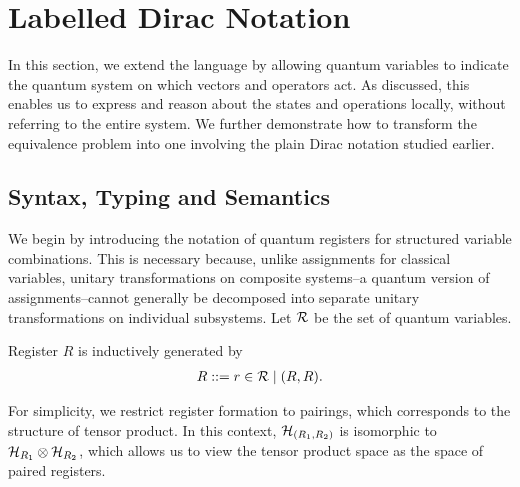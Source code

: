 
\section{Labelled Dirac Notation}
\label{sec: labelled}









In this section, we extend the language by allowing quantum variables to indicate the quantum system on which vectors and operators act. 
As discussed, this enables us to express and reason about the states and operations locally, without referring to the entire system. 
We further demonstrate how to transform the equivalence problem into one involving the plain Dirac notation studied earlier.

\subsection{Syntax, Typing and Semantics}
We begin by introducing the notation of quantum registers for structured variable combinations. This is necessary because, unlike assignments for classical variables, unitary transformations on composite systems--a quantum version of assignments--cannot generally be decomposed into separate unitary transformations on individual subsystems.
Let $\mathcal{R}$ be the set of quantum variables.
\begin{definition} Register $R$ is inductively generated by
  \begin{align*}
    R ::= r\in\mathcal{R} \mid (R, R).
  \end{align*}
\end{definition}
For simplicity, we restrict register formation to pairings, which corresponds to the structure of tensor product. In this context, ${\mathcal{H}}_{(R_1,R_2)}$ is isomorphic to ${\mathcal{H}}_{R_1}\otimes {\mathcal{H}}_{R_2}$, which allows us to view the tensor product space as the space of paired registers.

